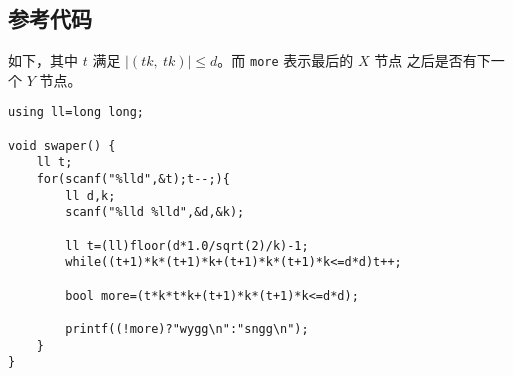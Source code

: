 \subsection{参考代码}
如下，其中 $t$ 满足 $|({tk},\ {tk})| \leq d$。而 \verb|more| 表示最后的 $X$ 节点
之后是否有下一个 $Y$ 节点。
\begin{lstlisting}
using ll=long long;

void swaper() {
    ll t;
    for(scanf("%lld",&t);t--;){
        ll d,k;
        scanf("%lld %lld",&d,&k);

        ll t=(ll)floor(d*1.0/sqrt(2)/k)-1;
        while((t+1)*k*(t+1)*k+(t+1)*k*(t+1)*k<=d*d)t++;

        bool more=(t*k*t*k+(t+1)*k*(t+1)*k<=d*d);

        printf((!more)?"wygg\n":"sngg\n");
    }
}
\end{lstlisting}

